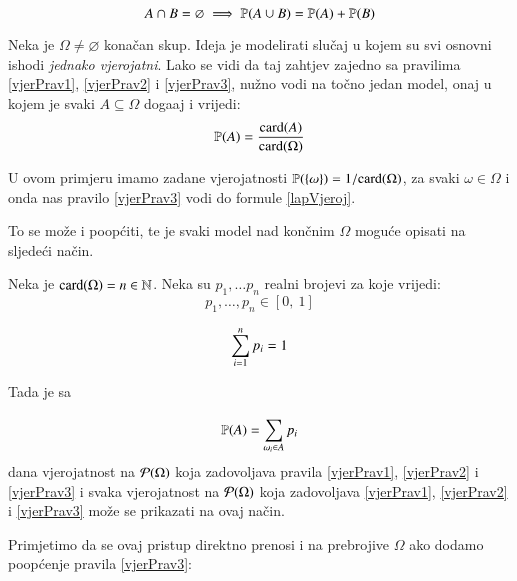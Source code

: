 \begin{equation} \label{vjerPrav3}
    A \cap B = \varnothing \implies \mathbb{P}({A \cup B}) = \mathbb{P}({A})
        + \mathbb{P}({B})
\end{equation}

\begin{pr} \label{primjer5}
    Neka je $\Omega \neq \varnothing$ kona\v can skup. Ideja je
    modelirati slu\v caj u kojem su svi osnovni ishodi \emph{jednako
    vjerojatni}. Lako se vidi da taj zahtjev zajedno sa pravilima
    \eqref{vjerPrav1}, \eqref{vjerPrav2} i \eqref{vjerPrav3},
    nu\v zno vodi na to\v cno jedan model, onaj u kojem je svaki
    $A \subseteq \Omega$ doga\dj aj i vrijedi:
    \begin{equation} \label{lapVjeroj}
        \mathbb{P}({A}) = \frac{\textnormal{card}({A})}{\textnormal{card}({\Omega})}
    \end{equation}
\end{pr}

U ovom primjeru imamo zadane vjerojatnosti $\mathbb{P}({\{ \omega\}})
= 1 / {\textnormal{card}({\Omega})}$, za svaki $\omega \in \Omega$ i onda nas
pravilo \eqref{vjerPrav3} vodi do formule \eqref{lapVjeroj}.

To se mo\v ze i poop\' citi, te je svaki model nad kon\v cnim
$\Omega$ mogu\' ce opisati na sljede\' ci na\v cin.

\begin{pr}
    Neka je $\textnormal{card}({\Omega}) = n \in \mathbb{N}$. Neka su $p_1, \dots p_n$
    realni brojevi za koje vrijedi:
    \begin{equation}
        p_1, \dots, p_n \in [0, \: 1]
    \end{equation}

    \begin{equation}
        \sum\limits_{i = 1}^{n} p_i = 1
    \end{equation}

    Tada je sa

    \begin{equation} \label{konacVP}
        \mathbb{P}({A}) = \sum\limits_{\omega_i \in A}^{} p_i
    \end{equation}
    dana vjerojatnost na $\mathcal{P}({\Omega})$ koja zadovoljava
    pravila \eqref{vjerPrav1}, \eqref{vjerPrav2} i \eqref{vjerPrav3}
    i svaka vjerojatnost na $\mathcal{P}({\Omega})$ koja zadovoljava
    \eqref{vjerPrav1}, \eqref{vjerPrav2} i \eqref{vjerPrav3} mo\v ze
    se prikazati na ovaj na\v cin.
\end{pr}

Primjetimo da se ovaj pristup direktno prenosi i na prebrojive
$\Omega$ ako dodamo poop\' cenje pravila \eqref{vjerPrav3}:

